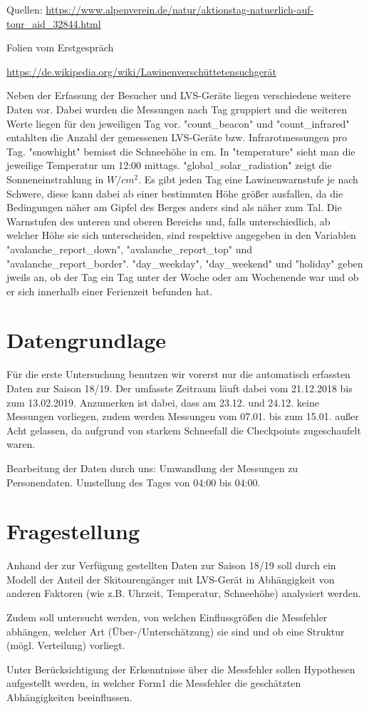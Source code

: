 \documentclass[11pt,a4paper]{report}
\begin{document}
Quellen: 
\url{https://www.alpenverein.de/natur/aktionstag-natuerlich-auf-tour_aid_32844.html}

Folien vom Erstgespräch

\url{https://de.wikipedia.org/wiki/Lawinenverschüttetensuchgerät}

Neben der Erfassung der Besucher und LVS-Geräte liegen verschiedene weitere Daten vor. Dabei wurden die Messungen nach Tag gruppiert und die weiteren Werte liegen für den jeweiligen Tag vor. "count\_beacon" und "count\_infrared" entahlten die Anzahl der gemessenen LVS-Geräte bzw. Infrarotmessungen pro Tag. "snowhight" bemisst die Schneehöhe in cm. In "temperature" sieht man die jeweilige Temperatur um 12:00 mittags. "global\_solar\_radiation" zeigt die Sonneneinstrahlung in $W/cm^2$. Es gibt jeden Tag eine Lawinenwarnstufe je nach Schwere, diese kann dabei ab einer bestimmten Höhe größer ausfallen, da die Bedingungen näher am Gipfel des Berges anders sind als näher zum Tal. Die Warnstufen des unteren und oberen Bereichs und, falls unterschiedlich, ab welcher Höhe sie sich unterscheiden, sind respektive angegeben in den Variablen "avalanche\_report\_down", "avalanche\_report\_top" und "avalanche\_report\_border". "day\_weekday", "day\_weekend" und "holiday" geben jweils an, ob der Tag ein Tag unter der Woche oder am Wochenende war und ob er sich innerhalb einer Ferienzeit befunden hat.





\section{Datengrundlage}
Für die erste Untersuchung benutzen wir vorerst nur die automatisch erfassten Daten zur Saison 18/19. Der umfasste Zeitraum läuft dabei vom 21.12.2018 bis zum 13.02.2019. Anzumerken ist dabei, dass am 23.12. und 24.12. keine Messungen vorliegen, zudem werden Messungen vom 07.01. bis zum 15.01. außer Acht gelassen, da aufgrund von starkem Schneefall die Checkpoints zugeschaufelt waren.

Bearbeitung der Daten durch uns:
Umwandlung der Messungen zu Personendaten. Umstellung des Tages von 04:00 bis 04:00.

\section{Fragestellung}
	\item Anhand der zur Verfügung gestellten Daten zur Saison 18/19 soll durch ein Modell der Anteil der Skitourengänger mit LVS-Gerät in Abhängigkeit von anderen Faktoren (wie z.B. Uhrzeit, Temperatur, Schneehöhe) analysiert werden.
\item Zudem soll untersucht werden, von welchen Einflussgrößen die Messfehler abhängen, welcher Art (Über-/Unterschätzung) sie sind und ob eine Struktur (mögl. Verteilung) vorliegt.
\item Unter Berücksichtigung der Erkenntnisse über die Messfehler sollen Hypothesen aufgestellt werden, in welcher Form1 die Messfehler die geschätzten Abhängigkeiten beeinflussen.
\end{document}

